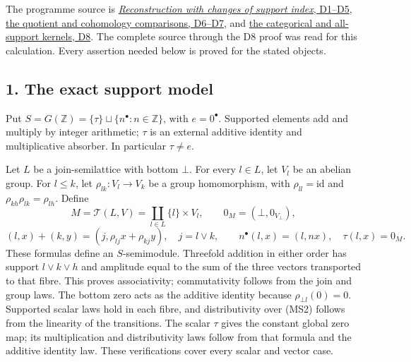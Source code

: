\documentclass[
]{article}
\begin{document}
The programme source is
\href{https://github.com/KokunoYumeto/zeta-function-research-reader/blob/39ced92952a9c807d51500783b221beb141da3b6/workbenches/splitzero-tandem/tex/support_diagrams.tex\#L9}{\emph{Reconstruction
with changes of support index}, D1--D5},
\href{https://github.com/KokunoYumeto/zeta-function-research-reader/blob/39ced92952a9c807d51500783b221beb141da3b6/workbenches/splitzero-tandem/tex/support_diagrams.tex\#L125}{the
quotient and cohomology comparisons, D6--D7}, and
\href{https://github.com/KokunoYumeto/zeta-function-research-reader/blob/39ced92952a9c807d51500783b221beb141da3b6/workbenches/splitzero-tandem/tex/support_diagrams.tex\#L178}{the
categorical and all-support kernels, D8}. The complete source through
the D8 proof was read for this calculation. Every assertion needed below
is proved for the stated objects.

\subsection{1. The exact support model}\label{the-exact-support-model}

Put \(S=G(\mathbb Z)=\{\tau\}\sqcup\{n^\bullet:n\in\mathbb Z\}\), with
\(e=0^\bullet\). Supported elements add and multiply by integer
arithmetic; \(\tau\) is an external additive identity and multiplicative
absorber. In particular \(\tau\ne e\).

Let \(L\) be a join-semilattice with bottom \(\bot\). For every
\(l\in L\), let \(V_l\) be an abelian group. For \(l\le k\), let
\(\rho_{lk}:V_l\to V_k\) be a group homomorphism, with
\(\rho_{ll}=\mathrm{id}\) and \(\rho_{kh}\rho_{lk}=\rho_{lh}\). Define
\[
M=\mathcal T(L,V)=\coprod_{l\in L}\{l\}\times V_l,
\qquad 0_M=(\bot,0_{V_\bot}),
\tag{MS1}
\] \[
(l,x)+(k,y)=(j,\rho_{lj}x+\rho_{kj}y),\quad j=l\vee k,
\qquad n^\bullet(l,x)=(l,nx),\quad \tau(l,x)=0_M.
\tag{MS2}
\] These formulas define an \(S\)-semimodule. Threefold addition in
either order has support \(l\vee k\vee h\) and amplitude equal to the
sum of the three vectors transported to that fibre. This proves
associativity; commutativity follows from the join and group laws. The
bottom zero acts as the additive identity because
\(\rho_{\bot l}(0)=0\). Supported scalar laws hold in each fibre, and
distributivity over (MS2) follows from the linearity of the transitions.
The scalar \(\tau\) gives the constant global zero map; its
multiplication and distributivity laws follow from that formula and the
additive identity law. These verifications cover every scalar and vector
case.
\end{document}
